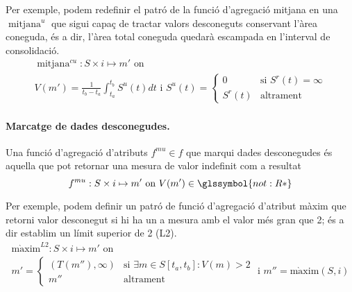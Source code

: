 Per exemple, podem redefinir el patró de la funció d'agregació mitjana
en una $\operatorname{mitjana}^{u}$ que sigui capaç de tractar valors
desconeguts conservant l'àrea coneguda, és a dir, l'àrea total
coneguda quedarà escampada en l'interval de consolidació.
\begin{gather*}
  \operatorname{mitjana}^{cu}: S \times i \mapsto m' \text{ on }\\
  V(m') = \frac{1}{t_b-t_a}\int_{t_a}^{t_b} S^u(t)dt \text{ i }
  S^u(t)=
  \begin{cases}
    0 &\text{si }  S^r(t)=\infty\\
    S^r(t) & \text{altrament }
  \end{cases}
\end{gather*}


\paragraph{Marcatge de dades desconegudes.}
Una funció d'agregació d'atributs $f^{mu} \in f$ que marqui
dades desconegudes és aquella que pot retornar una mesura de valor
indefinit com a resultat
\[
f^{mu}: S \times i \mapsto m' \text{ on } V(m')\in \glssymbol{not:R*}
\]


Per exemple, podem definir un patró de funció d'agregació d'atribut
màxim que retorni valor desconegut
si hi ha un a mesura amb el valor més gran que 2; és a dir establim un
límit superior de 2 (L2). 
\begin{gather*}
  \operatorname{m\grave{a}xim}^{L2}: S \times i \mapsto m' \text{ on }\\
  m' = \begin{cases}
    (T(m''),\infty) &\text{si }  \exists m\in S[t_a,t_b]: V(m)>2\\
    m'' & \text{altrament }
  \end{cases} \text{ i } m''= \operatorname{m\grave{a}xim}(S,i)
\end{gather*}














